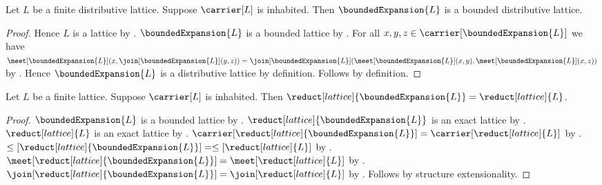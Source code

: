 \begin{theorem}\label{bounded_expansion_preserves_distributivity}
    Let $L$ be a finite distributive lattice.
    Suppose $\carrier[L]$ is inhabited.
    Then $\boundedExpansion{L}$ is a bounded distributive lattice.
\end{theorem}
\begin{proof}
    Hence $L$ is a lattice by .
    $\boundedExpansion{L}$ is a bounded lattice by
        .
    For all $x,y,z\in\carrier[\boundedExpansion{L}]$ we have
        $\meet[\boundedExpansion{L}]
            (x,\join[\boundedExpansion{L}](y,z))
        =\join[\boundedExpansion{L}]
            (\meet[\boundedExpansion{L}](x,y),
             \meet[\boundedExpansion{L}](x,z))$ by
        .
    Hence $\boundedExpansion{L}$ is a distributive lattice by definition.
    Follows by definition.
\end{proof}

\begin{theorem}\label{bounded_expansion_lattice_reduct}
    Let $L$ be a finite lattice.
    Suppose $\carrier[L]$ is inhabited.
    Then
        $\reduct[lattice]{\boundedExpansion{L}}
            =\reduct[lattice]{L}$.
\end{theorem}
\begin{proof}
    $\boundedExpansion{L}$ is a bounded lattice by
        .
    $\reduct[lattice]{\boundedExpansion{L}}$ is an exact lattice by
        .
    $\reduct[lattice]{L}$ is an exact lattice by
        .
    $\carrier[\reduct[lattice]{\boundedExpansion{L}}]
        =\carrier[\reduct[lattice]{L}]$ by
        .
    $\leq[\reduct[lattice]{\boundedExpansion{L}}]
        =\leq[\reduct[lattice]{L}]$ by
        .
    $\meet[\reduct[lattice]{\boundedExpansion{L}}]
        =\meet[\reduct[lattice]{L}]$ by
        .
    $\join[\reduct[lattice]{\boundedExpansion{L}}]
        =\join[\reduct[lattice]{L}]$ by
        .
    Follows by structure extensionality.
\end{proof}
